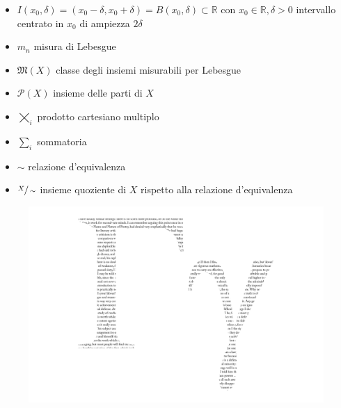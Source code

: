 \documentclass[12pt, twoside, italian]{book}
\begin{document}
\begin{itemize}[label=\hspace{-0.5em}]
		\item $I(x_0, \delta) = (x_0 - \delta, x_0 + \delta) = B(x_0, \delta) \subset \mathbb{R}$ con $x_0 \in \mathbb{R}, \delta > 0$ intervallo centrato in $x_0$ di ampiezza $2\delta$
		\item $m_n$ misura di Lebesgue
		\item $\mathfrak{M}(X)$ classe degli insiemi misurabili per Lebesgue
		\item $\mathcal{P}(X)$ insieme delle parti di $X$
		\item $\varprod\limits_i$ prodotto cartesiano multiplo
		\item $\sum\limits_i$ sommatoria
		\item $\sim$ relazione d'equivalenza
		\item $\sfrac{X}{\sim}$ insieme quoziente di $X$ rispetto alla relazione d'equivalenza
 
	\end{itemize}
	
	
	
	
	
	
	
	\newpage
	\clearpage
	\cleardoublepage
	\pagestyle{plain}
	\thispagestyle{empty}
	\vspace*{\fill}
	\begin{figure}[H]
		\centering
		\hspace*{-1cm}
		\includegraphics[scale=0.25]{immagini/gamma_illustrata.png}
	\end{figure}
	\vspace*{\fill}
	\pagestyle{empty}
\end{document}
